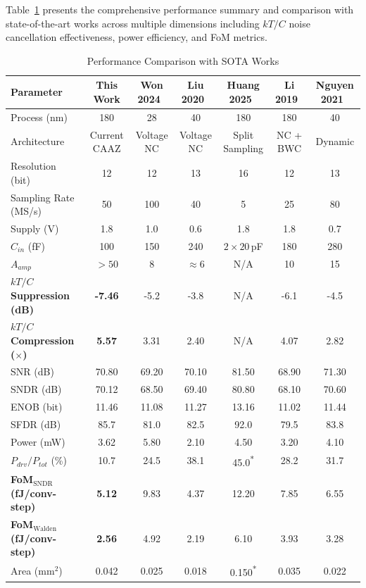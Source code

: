 \documentclass[journal]{IEEEtran}
\begin{document}
Table~\ref{tab:performance_comparison} presents the comprehensive performance summary and comparison with state-of-the-art works across multiple dimensions including $kT/C$ noise cancellation effectiveness, power efficiency, and FoM metrics.

\begin{table}[!t]
\caption{Performance Comparison with SOTA Works}
\label{tab:performance_comparison}
\centering
\footnotesize
\begin{tabular}{|l|c|c|c|c|c|c|}
\hline
\textbf{Parameter} & \textbf{This Work} & \textbf{Won 2024~\cite{won2024esserc}} & \textbf{Liu 2020~\cite{liu202013bit}} & \textbf{Huang 2025~\cite{huang2025split}} & \textbf{Li 2019~\cite{li2019compression}} & \textbf{Nguyen 2021~\cite{nguyen2021dynamic}} \\
\hline
Process (nm) & 180 & 28 & 40 & 180 & 180 & 40 \\
\hline
Architecture & Current CAAZ & Voltage NC & Voltage NC & Split Sampling & NC + BWC & Dynamic \\
\hline
Resolution (bit) & 12 & 12 & 13 & 16 & 12 & 13 \\
\hline
Sampling Rate (MS/s) & 50 & 100 & 40 & 5 & 25 & 80 \\
\hline
Supply (V) & 1.8 & 1.0 & 0.6 & 1.8 & 1.8 & 0.7 \\
\hline
$C_{in}$ (fF) & 100 & 150 & 240 & $2\times20$\,pF & 180 & 280 \\
\hline
$A_{amp}$ & $>50$ & 8 & $\approx6$ & N/A & 10 & 15 \\
\hline
\textbf{$kT/C$ Suppression (dB)} & \textbf{-7.46} & -5.2 & -3.8 & N/A & -6.1 & -4.5 \\
\hline
\textbf{$kT/C$ Compression ($\times$)} & \textbf{5.57} & 3.31 & 2.40 & N/A & 4.07 & 2.82 \\
\hline
SNR (dB) & 70.80 & 69.20 & 70.10 & 81.50 & 68.90 & 71.30 \\
\hline
SNDR (dB) & 70.12 & 68.50 & 69.40 & 80.80 & 68.10 & 70.60 \\
\hline
ENOB (bit) & 11.46 & 11.08 & 11.27 & 13.16 & 11.02 & 11.44 \\
\hline
SFDR (dB) & 85.7 & 81.0 & 82.5 & 92.0 & 79.5 & 83.8 \\
\hline
Power (mW) & 3.62 & 5.80 & 2.10 & 4.50 & 3.20 & 4.10 \\
\hline
$P_{drv}/P_{tot}$ (\%) & 10.7 & 24.5 & 38.1 & 45.0\textsuperscript{*} & 28.2 & 31.7 \\
\hline
\textbf{FoM$_{\text{SNDR}}$ (fJ/conv-step)} & \textbf{5.12} & 9.83 & 4.37 & 12.20 & 7.85 & 6.55 \\
\hline
\textbf{FoM$_{\text{Walden}}$ (fJ/conv-step)} & \textbf{2.56} & 4.92 & 2.19 & 6.10 & 3.93 & 3.28 \\
\hline
Area (mm$^2$) & 0.042 & 0.025 & 0.018 & 0.150\textsuperscript{*} & 0.035 & 0.022 \\
\hline
\end{tabular}
\end{table}
\end{document}
